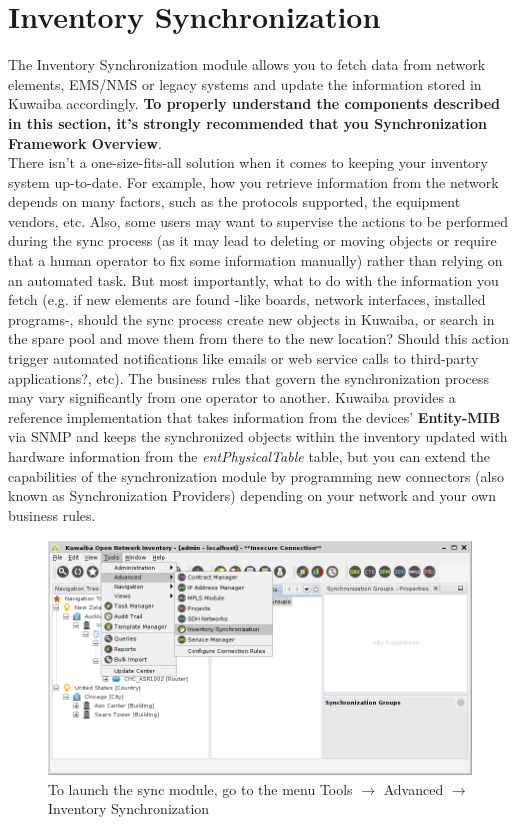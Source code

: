 \documentclass[a4paper]{article}
\begin{document}
		\section{Inventory Synchronization}\label{sec:sync}
			The Inventory Synchronization module allows you to fetch data from network elements, EMS/NMS or legacy systems and update the information stored in Kuwaiba accordingly. \textbf{To properly understand the components described in this section, it's strongly recommended that you Synchronization Framework Overview}. \\
			\newline
			There isn't a one-size-fits-all solution when it comes to keeping your inventory system up-to-date. For example, how you retrieve information from the network depends on many factors, such as the protocols supported, the equipment vendors, etc. Also, some users may want to supervise the actions to be performed during the sync process (as it may lead to deleting or moving objects or require that a human operator to fix some information manually) rather than relying on an automated task. But most importantly, what to do with the information you fetch (e.g. if new elements are found -like boards, network interfaces, installed programs-, should the sync process create new objects in Kuwaiba, or search in the spare pool and move them from there to the new location? Should this action trigger automated notifications like emails or web service calls to third-party applications?, etc). The business rules that govern the synchronization process may vary significantly from one operator to another. Kuwaiba provides a reference implementation that takes information from the devices' \textbf{Entity-MIB} via SNMP and keeps the synchronized objects within the inventory updated with hardware information from the \textit{entPhysicalTable} table, but you can extend the capabilities of the synchronization module by programming new connectors (also known as Synchronization Providers) depending on your network and your own business rules.\\

			\begin{figure}[h!]
				\centering
				\includegraphics[width=0.8\linewidth]{img/sync_menu_open_sync_module.png}
				\caption{To launch the sync module, go to the menu Tools $\rightarrow$ Advanced $\rightarrow$ Inventory Synchronization}
				\label{fig:sync_menu_open_sync_module}
			\end{figure}
		
\end{document}
